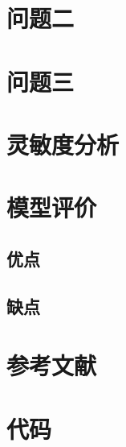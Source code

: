 \documentclass[12pt,a4paper]{article}
\begin{document}
\section{问题二}

\section{问题三}

\section{灵敏度分析}

\section{模型评价}

\subsection{优点}

\subsection{缺点}

\section*{参考文献}

\appendix
\section{代码}
\end{document}
